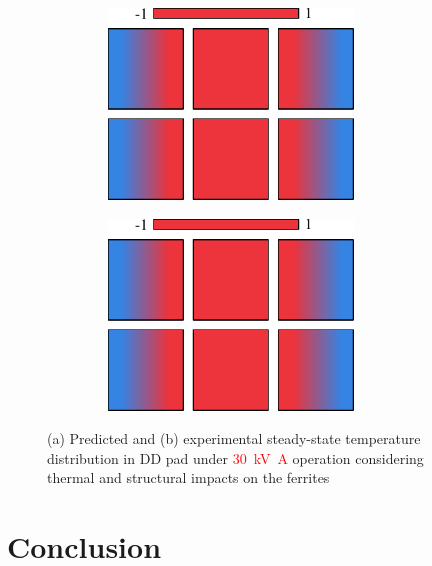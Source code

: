 \documentclass[conference]{IEEEtran}
\begin{document}
\lipsum[2]

\begin{figure}[t]
  \centering
  \begin{subfigure}{\columnwidth}
    \centering
    \includegraphics[width=3in, height=2in]{figures/simulatedpottingpadstresses.pdf}
    \caption{}
  \end{subfigure}

  \begin{subfigure}{\columnwidth}
    \centering
    \includegraphics[width=3in, height=2in]{figures/simulatedpottingpadstresses.pdf}
    \caption{}
  \end{subfigure}
  \caption{(a) Predicted and (b) experimental steady-state temperature distribution in DD pad under \textcolor{red}{\SI{30}{\kilo\volt\ampere}} operation considering thermal and structural impacts on the ferrites}
  \label{fig:temperaturecomparison}
\end{figure}

\section{Conclusion}
\label{sec:conclusion}
\end{document}
